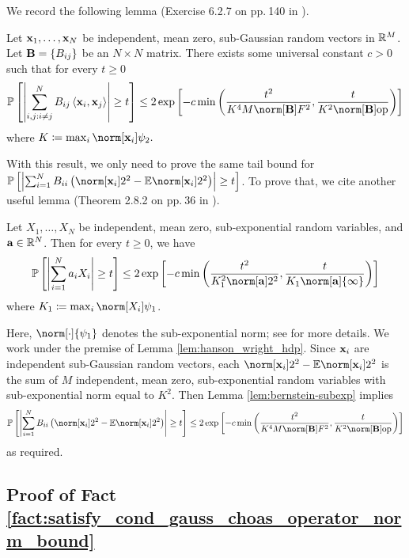 We record the following lemma (Exercise 6.2.7 on pp.$\ $140 in \citet{vershynin2017high}).
\begin{lem}
\emph{} \label{lem:hanson_wright_hdp} Let $\mathbf{x}_{1},\ldots,\mathbf{x}_{N}$
be independent, mean zero, sub-Gaussian random vectors in $\mathbb{R}^{M}$.
Let $\mathbf{B}=\left\{ B_{ij}\right\} $ be an $N\times N$ matrix. There
exists some universal constant $c>0$ such that for every $t\geq0$
\[
\P\left[\left|\sum_{i,j:i\ne j}^{N}B_{ij}\left\langle \x_{i},\x_{j}\right\rangle \right|\geq t\right]\leq2\exp\left[-c\min\left(\frac{t^{2}}{K^{4}M\norm[\B]F^{2}},\frac{t}{K^{2}\opnorm{\B}}\right)\right]
\]
where $K\coloneqq\max_{i}\norm[\x_{i}]{\psi_{2}}.$ 
\end{lem}
With this result, we only need to prove the same tail bound for $\P\left[\left|\sum_{i=1}^{N}B_{ii}\left(\norm[\x_{i}]2^{2}-\E\norm[\x_{i}]2^{2}\right)\right|\geq t\right]$.
To prove that, we cite another useful lemma (Theorem 2.8.2 on pp.$\ $36
in \citet{vershynin2017high}).
\begin{lem}
\emph{}\label{lem:bernstein-subexp} Let $X_{1},\ldots,X_{N}$ be
independent, mean zero, sub-exponential random variables, and $\mathbf{a}\in\mathbb{R}^{N}$.
Then for every $t\geq0$, we have 
\[
\P\left[\left|\sum_{i=1}^{N}a_{i}X_{i}\right|\geq t\right]\leq2\exp\left[-c\min\left(\frac{t^{2}}{K_{1}^{2}\norm[\a]2^{2}},\frac{t}{K_{1}\norm[\a]{\infty}}\right)\right]
\]
where $K_{1}\coloneqq\max_{i}\norm[X_{i}]{\psi_{1}}$.
\end{lem}
Here, $\norm[\cdot]{\psi_{1}}$ denotes the sub-exponential norm;
see \citet{vershynin2017high} for more details. We work under the
premise of Lemma \ref{lem:hanson_wright_hdp}. Since $\mathbf{x}_{i}$ are
independent sub-Gaussian random vectors, each $\norm[\x_{i}]2^{2}-\E\norm[\x_{i}]2^{2}$
is the sum of $M$ independent, mean zero, sub-exponential random
variables with sub-exponential norm equal to $K^{2}$. Then Lemma
\ref{lem:bernstein-subexp} implies 
\[
\P\left[\left|\sum_{i=1}^{N}B_{ii}\left(\norm[\x_{i}]2^{2}-\E\norm[\x_{i}]2^{2}\right)\right|\geq t\right]\leq2\exp\left[-c\min\left(\frac{t^{2}}{K^{4}M\norm[\B]F^{2}},\frac{t}{K^{2}\opnorm{\B}}\right)\right]
\]
as required. 

\subsection{Proof of Fact \ref{fact:satisfy_cond_gauss_choas_operator_norm_bound}
\label{sec:proof_satisfy_cond}}

